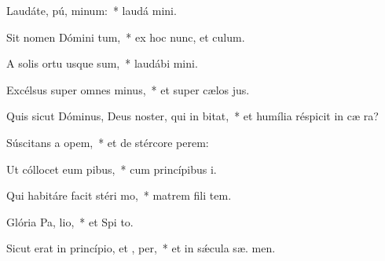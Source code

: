 \item Laudáte, pú, minum:~* laudá  mini.
\item Sit nomen Dómini tum,~* ex hoc nunc, et   culum.
\item A solis ortu usque  sum,~* laudábi  mini.
\item Excélsus super omnes  minus,~* et super cælos  jus.
\item Quis sicut Dóminus, Deus noster, qui in  bitat,~* et humília réspicit in cæ   ra?
\item Súscitans a  opem,~* et de stércore  perem:
\item Ut cóllocet eum  pibus,~* cum princípibus  i.
\item Qui habitáre facit stéri  mo,~* matrem fili tem.
\item Glória Pa,  lio,~* et Spi to.
\item Sicut erat in princípio, et ,  per,~* et in sǽcula sæ. men.
